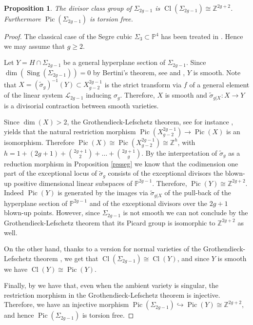 \documentclass[a4paper,10pt]{amsart}
\newtheorem{Proposition}[thm]{Proposition}
\theoremstyle{definition}
\DeclareMathOperator{\Cl}{Cl}
\DeclareMathOperator{\Pic}{Pic}
\DeclareMathOperator{\Sing}{Sing}
\begin{document}
\begin{Proposition}\label{picsegre}
The divisor class group of $\Sigma_{2g-1}$ is $\Cl(\Sigma_{2g-1})\cong \mathbb{Z}^{2g+2}$. Furthermore $\Pic(\Sigma_{2g-1})$ is torsion free.
\end{Proposition}
\begin{proof}
The classical case of the Segre cubic $\Sigma_3\subset\mathbb{P}^4$ has been treated in \cite[Section 3.2.2]{Hu96}. Hence we may assume that $g\geq 2$. 

Let $Y = H\cap\Sigma_{2g-1}$ be a general hyperplane section of $\Sigma_{2g-1}$. Since $\dim(\Sing(\Sigma_{2g-1}))=0$ by Bertini's theorem, see \cite[Corollary 10.9]{Ha77} and \cite[Remark 10.9.2]{Ha77}, $Y$ is smooth. Note that $X = (\widetilde{\sigma}_g)^{-1}(Y)\subset X^{2g-1}_{g-2}$ is the strict transform via $f$ of a general element of the linear system $\mathcal{L}_{2g-1}$ inducing $\sigma_g$. Therefore, $X$ is smooth and $\widetilde{\sigma}_{g|X}:X\rightarrow Y$ is a divisorial contraction between smooth varieties.

Since $\dim(X)>2$, the Grothendieck-Lefschetz theorem, see for instance \cite[Theorem A]{Ba78}, yields that the natural restriction morphism $\Pic(X^{2g-1}_{g-2})\rightarrow\Pic(X)$ is an isomorphism. Therefore $\Pic(X)\cong \Pic(X^{2g-1}_{g-2})\cong \mathbb{Z}^h$, with $h  = 1+(2g+1)+\binom{2g+1}{2}+\dots+\binom{2g+1}{g}$. By the interpretation of $\widetilde{\sigma}_{g}$ as a reduction morphism in Proposition \ref{resseg} we know that the codimension one part of the exceptional locus of $\widetilde{\sigma}_{g}$ consists of the exceptional divisors the blown-up positive dimensional linear subspaces of $\mathbb{P}^{2g-1}$. Therefore, $\Pic(Y)\cong \mathbb{Z}^{2g+2}$. Indeed $\Pic(Y)$ is generated by the images via $\widetilde{\sigma}_{g|X}$ of the pull-back of the hyperplane section of $\mathbb{P}^{2g-1}$ and of the exceptional divisors over the $2g+1$ blown-up points. However, since $\Sigma_{2g-1}$ is not smooth we can not conclude by the Grothendieck-Lefschetz theorem that its Picard group is isomorphic to $\mathbb{Z}^{2g+2}$ as well.

On the other hand, thanks to a version for normal varieties of the Grothendieck-Lefschetz theorem \cite[Theorem 1]{RS06}, we get that $\Cl(\Sigma_{2g-1})\cong\Cl(Y)$, and since $Y$ is smooth we have $\Cl(Y)\cong\Pic(Y)$. 

Finally, by \cite[Corollary 2, Page 305]{Kl66} we have that, even when the ambient variety is singular, the restriction morphism in the Grothendieck-Lefschetz theorem is injective. Therefore, we have an injective morphism $\Pic(\Sigma_{2g-1})\hookrightarrow \Pic(Y)\cong\mathbb{Z}^{2g+2}$, and hence $\Pic(\Sigma_{2g-1})$ is torsion free. 
\end{proof}
\end{document}
